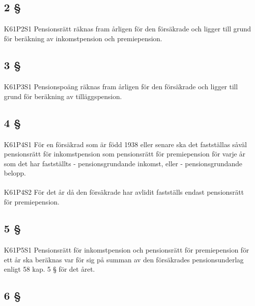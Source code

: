 \documentclass[a4paper,notitlepage,openany,10pt]{book}
\begin{document}
\subsection*{2 §}
\paragraph*{}
{\tiny K61P2S1}
Pensionsrätt räknas fram årligen för den försäkrade och ligger till grund för beräkning av inkomstpension och premiepension.
\subsection*{3 §}
\paragraph*{}
{\tiny K61P3S1}
Pensionspoäng räknas fram årligen för den försäkrade och ligger till grund för beräkning av tilläggspension.
\subsection*{4 §}
\paragraph*{}
{\tiny K61P4S1}
För en försäkrad som är född 1938 eller senare ska det fastställas såväl pensionsrätt för inkomstpension som pensionsrätt för premiepension för varje år som det har fastställts
\newline - pensionsgrundande inkomst, eller
\newline - pensionsgrundande belopp.
\paragraph*{}
{\tiny K61P4S2}
För det år då den försäkrade har avlidit fastställs endast pensionsrätt för premiepension.
\subsection*{5 §}
\paragraph*{}
{\tiny K61P5S1}
Pensionsrätt för inkomstpension och pensionsrätt för premiepension för ett år ska beräknas var för sig på summan av den försäkrades pensionsunderlag enligt 58 kap. 5 § för det året.
\subsection*{6 §}
\end{document}
